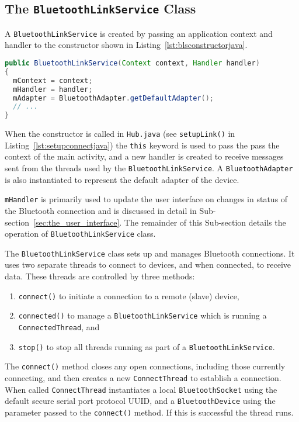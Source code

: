 \documentclass[11pt, a4paper, oneside, english]{scrbook}
\begin{document}
\subsection{The \texttt{BluetoothLinkService} Class} %
\label{sub:bls}
A \texttt{BluetoothLinkService} is created by passing an application context and handler to the constructor shown in Listing~\ref{lst:blsconstructorjava}.
\begin{lstlisting}[language=Java,
                   caption={The \texttt{BluetoothLinkService} constructor.},
                   label=lst:blsconstructorjava,
                   numbers=none]
public BluetoothLinkService(Context context, Handler handler)
{
  mContext = context;
  mHandler = handler;
  mAdapter = BluetoothAdapter.getDefaultAdapter();
  // ...
}
\end{lstlisting}
When the constructor is called in \texttt{Hub.java} (see \texttt{setupLink()} in Listing~\ref{lst:setupconnectjava}) the \texttt{this} keyword is used to pass the pass the context of the main activity, and a new handler is created to receive messages sent from the threads used by the \texttt{BluetoothLinkService}. A \texttt{BluetoothAdapter} is also instantiated to represent the default adapter of the device.

\texttt{mHandler} is primarily used to update the user interface on changes in status of the Bluetooth connection and is discussed in detail in Sub-section~\ref{sec:the_user_interface}. The remainder of this Sub-section details the operation of \texttt{BluetoothLinkService} class.

The \texttt{BluetoothLinkService} class sets up and manages Bluetooth connections. It uses two separate threads to connect to devices, and when connected, to receive data. These threads are controlled by three methods:
\begin{enumerate}
\item \texttt{connect()} to initiate a connection to a remote (slave) device,
\item \texttt{connected()} to manage a \texttt{BluetoothLinkService} which is running a \texttt{ConnectedThread}, and
\item \texttt{stop()} to stop all threads running as part of a \texttt{BluetoothLinkService}.
\end{enumerate}
The \texttt{connect()} method closes any open connections, including those currently connecting, and then creates a new \texttt{ConnectThread} to establish a connection. When called \texttt{ConnectThread} instantiates a local \texttt{BluetoothSocket} using the default secure serial port protocol UUID, and a \texttt{BluetoothDevice} using the parameter passed to the \texttt{connect()} method. If this is successful the thread runs.
\end{document}
